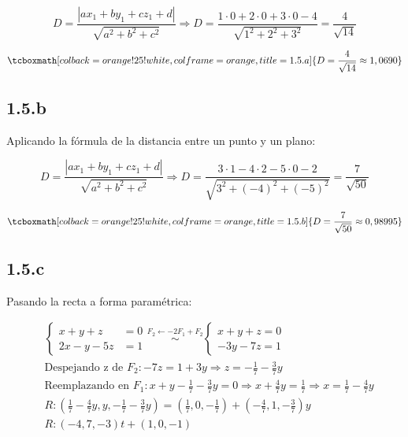 \documentclass{article}
\begin{document}
\begin{equation}
D = \frac{|a x_1 + b y_1 + c z_1 + d|}{\sqrt{a^2 + b^2 + c^2}} \Rightarrow D = \frac{1 \cdot 0 + 2 \cdot 0 + 3 \cdot 0 - 4}{\sqrt{1^2 + 2^2 + 3^2}} = \frac{4}{\sqrt{14}}
\end{equation}

\begin{equation}
\tcboxmath[colback=orange!25!white,colframe=orange,title=1.5.a]
{ D = \frac{4}{\sqrt{14}} \approx 1,0690 }
\end{equation}

\subsection*{1.5.b}
\label{subsec:1.5.b}

Aplicando la fórmula de la distancia entre un punto y un plano:

\begin{equation}
D = \frac{|a x_1 + b y_1 + c z_1 + d|}{\sqrt{a^2 + b^2 + c^2}} \Rightarrow D = \frac{3 \cdot 1 - 4 \cdot 2 - 5 \cdot 0 - 2}{\sqrt{3^2 + (-4)^2 + (-5)^2}} = \frac{7}{\sqrt{50}}
\end{equation}

\begin{equation}
\tcboxmath[colback=orange!25!white,colframe=orange,title=1.5.b]
{ D = \frac{7}{\sqrt{50}} \approx 0,98995 }
\end{equation}

\subsection*{1.5.c}
\label{subsec:1.5.c}

Pasando la recta a forma paramétrica:

\begin{subequations}
\begin{align}
& \left\{ \begin{array}{lr}
x + y + z &= 0 \\
2x - y - 5z &= 1
\end{array} \right. \overset{F_2 \leftarrow -2F_1 + F_2}{\sim} \left\{ \begin{array}{ll}
x + y + z = 0 \\
-3y -7z = 1
\end{array} \right. \\
& \text{Despejando z de } F_2: -7z = 1 + 3y \Rightarrow z = -\frac{1}{7} -\frac{3}{7} y \\
& \text{Reemplazando en } F_1: x + y - \frac{1}{7} -\frac{3}{7} y = 0 \Rightarrow x + \frac{4}{7} y = \frac{1}{7} \Rightarrow x = \frac{1}{7} -\frac{4}{7} y \\
& R: \left( \frac{1}{7} -\frac{4}{7}y, y, -\frac{1}{7} -\frac{3}{7} y \right) = \left( \frac{1}{7}, 0, -\frac{1}{7} \right) + \left( -\frac{4}{7}, 1, -\frac{3}{7} \right) y \\
& R: (-4, 7, -3) t + (1, 0, -1)
\end{align}
\end{subequations}
\end{document}
